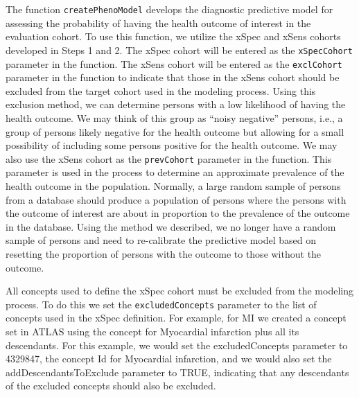 \documentclass[11pt]{book}
\theoremstyle{definition}
\theoremstyle{definition}
\theoremstyle{definition}
\theoremstyle{remark}
\begin{document}
The function \texttt{createPhenoModel} develops the diagnostic
predictive model for assessing the probability of having the health
outcome of interest in the evaluation cohort. To use this function, we
utilize the xSpec and xSens cohorts developed in Steps 1 and 2. The
xSpec cohort will be entered as the \texttt{xSpecCohort} parameter in
the function. The xSens cohort will be entered as the
\texttt{exclCohort} parameter in the function to indicate that those in
the xSens cohort should be excluded from the target cohort used in the
modeling process. Using this exclusion method, we can determine persons
with a low likelihood of having the health outcome. We may think of this
group as ``noisy negative'' persons, i.e., a group of persons likely
negative for the health outcome but allowing for a small possibility of
including some persons positive for the health outcome. We may also use
the xSens cohort as the \texttt{prevCohort} parameter in the function.
This parameter is used in the process to determine an approximate
prevalence of the health outcome in the population. Normally, a large
random sample of persons from a database should produce a population of
persons where the persons with the outcome of interest are about in
proportion to the prevalence of the outcome in the database. Using the
method we described, we no longer have a random sample of persons and
need to re-calibrate the predictive model based on resetting the
proportion of persons with the outcome to those without the outcome.

All concepts used to define the xSpec cohort must be excluded from the
modeling process. To do this we set the \texttt{excludedConcepts}
parameter to the list of concepts used in the xSpec definition. For
example, for MI we created a concept set in ATLAS using the concept for
Myocardial infarction plus all its descendants. For this example, we
would set the excludedConcepts parameter to 4329847, the concept Id for
Myocardial infarction, and we would also set the addDescendantsToExclude
parameter to TRUE, indicating that any descendants of the excluded
concepts should also be excluded.
\end{document}
